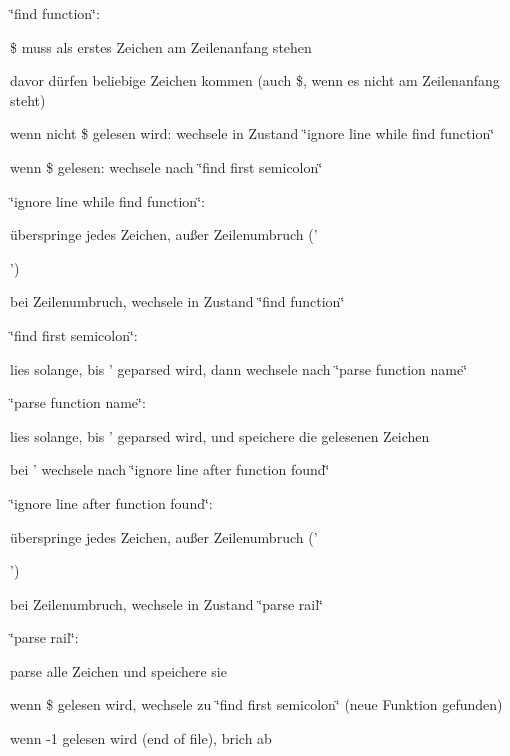 \char`\"{}find function\char`\"{}\-:
\begin{DoxyItemize}
\item \$ muss als erstes Zeichen am Zeilenanfang stehen
\item davor dürfen beliebige Zeichen kommen (auch \$, wenn es nicht am Zeilenanfang steht)
\item wenn nicht \$ gelesen wird\-: wechsele in Zustand \char`\"{}ignore line while find function\char`\"{}
\item wenn \$ gelesen\-: wechsele nach \char`\"{}find first semicolon\char`\"{}
\end{DoxyItemize}

\char`\"{}ignore line while find function\char`\"{}\-:
\begin{DoxyItemize}
\item überspringe jedes Zeichen, außer Zeilenumbruch ('\par
')
\item bei Zeilenumbruch, wechsele in Zustand \char`\"{}find function\char`\"{}
\end{DoxyItemize}

\char`\"{}find first semicolon\char`\"{}\-:
\begin{DoxyItemize}
\item lies solange, bis ' geparsed wird, dann wechsele nach \char`\"{}parse function name\char`\"{}
\end{DoxyItemize}

\char`\"{}parse function name\char`\"{}\-:
\begin{DoxyItemize}
\item lies solange, bis ' geparsed wird, und speichere die gelesenen Zeichen
\item bei ' wechsele nach \char`\"{}ignore line after function found\char`\"{}
\end{DoxyItemize}

\char`\"{}ignore line after function found\char`\"{}\-:
\begin{DoxyItemize}
\item überspringe jedes Zeichen, außer Zeilenumbruch ('\par
')
\item bei Zeilenumbruch, wechsele in Zustand \char`\"{}parse rail\char`\"{}
\end{DoxyItemize}

\char`\"{}parse rail\char`\"{}\-:
\begin{DoxyItemize}
\item parse alle Zeichen und speichere sie
\item wenn \$ gelesen wird, wechsele zu \char`\"{}find first semicolon\char`\"{} (neue Funktion gefunden)
\item wenn -\/1 gelesen wird (end of file), brich ab 
\end{DoxyItemize}